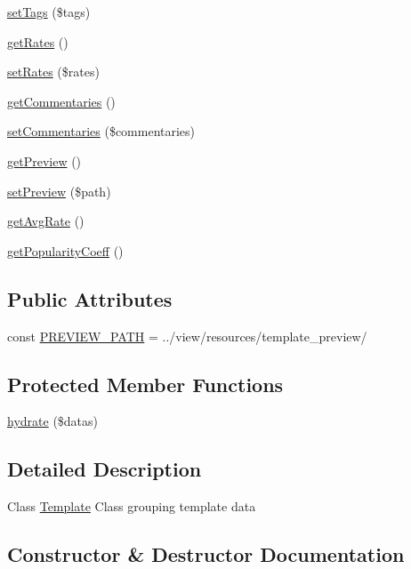 \begin{DoxyCompactItemize}
\item 
\hyperlink{classTemplate_af8abc3eef4b5136beb32b8c280a8bb1b}{set\+Tags} (\$tags)
\item 
\hyperlink{classTemplate_a3be5163aadc141778882b8d4bcdcc54e}{get\+Rates} ()
\item 
\hyperlink{classTemplate_afa975039c5d8302c60d578e8c1480f13}{set\+Rates} (\$rates)
\item 
\hyperlink{classTemplate_ac33cd0391843f7ace26c7302937ed222}{get\+Commentaries} ()
\item 
\hyperlink{classTemplate_a728d161f42ea44d56892b770e3632dd3}{set\+Commentaries} (\$commentaries)
\item 
\hyperlink{classTemplate_a7be2f649d0d6366226de02d40128fcc0}{get\+Preview} ()
\item 
\hyperlink{classTemplate_ade3127512a43250093e33c2564aa1d8d}{set\+Preview} (\$path)
\item 
\hyperlink{classTemplate_abc14756682dcf97f7fb809d9a006ea7f}{get\+Avg\+Rate} ()
\item 
\hyperlink{classTemplate_a68f43c52e0ef9cf943eb765793cdbc5d}{get\+Popularity\+Coeff} ()
\end{DoxyCompactItemize}
\subsection*{Public Attributes}
\begin{DoxyCompactItemize}
\item 
const \hyperlink{classTemplate_a0fa014aee55ffb6680347e2786c31858}{P\+R\+E\+V\+I\+E\+W\+\_\+\+P\+A\+TH} = \textquotesingle{}../view/resources/template\+\_\+preview/\textquotesingle{}
\end{DoxyCompactItemize}
\subsection*{Protected Member Functions}
\begin{DoxyCompactItemize}
\item 
\hyperlink{classTemplate_a4a65a1fcda5b768c5a1fdae2b4162962}{hydrate} (\$datas)
\end{DoxyCompactItemize}


\subsection{Detailed Description}
Class \hyperlink{classTemplate}{Template} Class grouping template data 

\subsection{Constructor \& Destructor Documentation}
\mbox{\label{classTemplate_a4150ce7e1cc4e8ef41e6dfb7a7182fa4}} 

